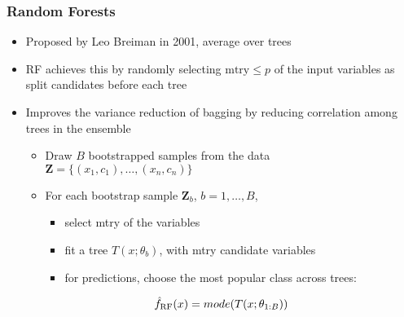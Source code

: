 \documentclass{beamer}
\begin{document}
\begin{frame}

    \frametitle{Random Forests}
    
    
    \begin{itemize}
        \item Proposed by Leo Breiman in 2001, average over trees
        \item RF achieves this by randomly selecting $\text{mtry} \le p$ of the
              input variables as split candidates before each tree %
        \item Improves the variance reduction of bagging by reducing correlation
              among trees in the ensemble
            \begin{itemize}
            \small
                \item Draw $B$ bootstrapped samples from the data 
                      $\boldsymbol{Z} = \{(x_1,c_1), \dots, (x_n,c_n)\}$
                \item For each bootstrap sample $\boldsymbol{Z}_{b}$, $b = 1,\dots,B$,
		\begin{itemize}
			\item select mtry of the variables  
                		\item fit a tree $T(x; \theta_b)$, with mtry candidate variables
			\item for predictions, choose the most popular class across trees:
		\end{itemize}
    	\end{itemize}
              \begin{equation}
                \small
                    \hat{f}_\text{RF}(x) = mode(T(x; \theta_{1:B}))
                \end{equation}
    \end{itemize}

\end{frame}


\end{document}

